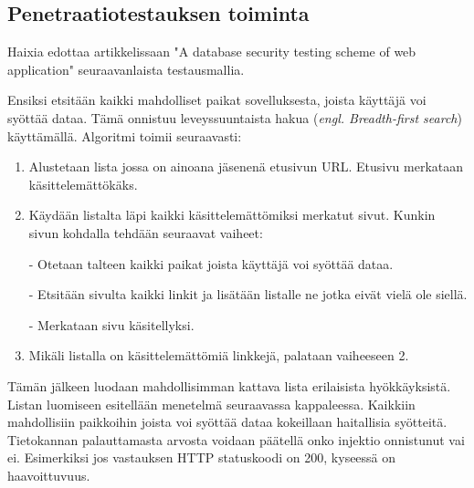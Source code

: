 \documentclass[finnish]{tktltiki2}
\theoremstyle{definition}
\theoremstyle{remark}
\begin{document}
	\subsection{Penetraatiotestauksen toiminta}
	 Haixia edottaa artikkelissaan "A database security testing scheme of web application"\space\cite{testing} seuraavanlaista testausmallia.
	
	Ensiksi etsitään kaikki mahdolliset paikat sovelluksesta, joista käyttäjä voi syöttää dataa. Tämä onnistuu leveyssuuntaista hakua (\textit{engl. Breadth-first search}) käyttämällä. Algoritmi toimii seuraavasti:
	\begin{enumerate}
		\item Alustetaan lista jossa on ainoana jäsenenä etusivun URL. Etusivu merkataan käsittelemättökäks.
		
		\item Käydään listalta läpi kaikki käsittelemättömiksi merkatut sivut. Kunkin sivun kohdalla tehdään seuraavat vaiheet:
		
		- Otetaan talteen kaikki paikat joista käyttäjä voi syöttää dataa.
		
		- Etsitään sivulta kaikki linkit ja lisätään listalle ne jotka eivät vielä ole siellä.
		
		- Merkataan sivu käsitellyksi.
		
		\item Mikäli listalla on käsittelemättömiä linkkejä, palataan vaiheeseen 2.
	\end{enumerate}
	
	Tämän jälkeen luodaan mahdollisimman kattava lista erilaisista hyökkäyksistä. Listan luomiseen esitellään menetelmä seuraavassa kappaleessa. Kaikkiin mahdollisiin paikkoihin joista voi syöttää dataa kokeillaan haitallisia syötteitä. Tietokannan palauttamasta arvosta voidaan päätellä onko injektio onnistunut vai ei. Esimerkiksi jos vastauksen HTTP statuskoodi on 200, kyseessä on haavoittuvuus. 
	
\end{document}

